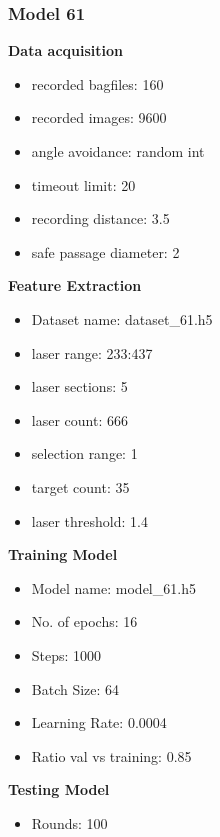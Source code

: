 \subsubsection{Model 61\label{model_61} }
\begin{multicols}{2}\textbf{Data acquisition}
\begin{itemize}
\setlength\itemsep{0.1em}
\item recorded bagfiles: 160
\item recorded images: 9600
\item angle avoidance: random int
\item timeout limit: 20
\item recording distance: 3.5
\item safe passage diameter: 2
\end{itemize}
\textbf{Feature Extraction}
\begin{itemize}
\setlength\itemsep{0.1em}
\item Dataset name: dataset\_61.h5
\item  laser range: 233:437
\item  laser sections: 5
\item  laser count: 666
\item  selection range: 1
\item  target count: 35
\item  laser threshold: 1.4
\end{itemize}
\columnbreak\textbf{Training Model}
\begin{itemize}
\setlength\itemsep{0.1em}
\item  Model name: model\_61.h5
\item  No. of epochs: 16
\item  Steps: 1000
\item  Batch Size: 64
\item  Learning Rate: 0.0004
\item  Ratio val vs training: 0.85
\end{itemize}
\textbf{Testing Model}
\begin{itemize}
\setlength\itemsep{0.1em}
\item Rounds: 100
\newline
\newline
\newline
\newline
\newline
\newline
\newline
\newline

\end{itemize}
\end{multicols}
